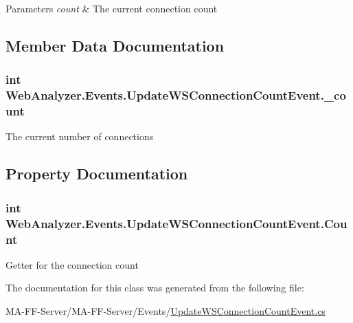 \begin{DoxyParams}{Parameters}
{\em count} & The current connection count\\
\hline
\end{DoxyParams}


\subsection{Member Data Documentation}
\hypertarget{class_web_analyzer_1_1_events_1_1_update_w_s_connection_count_event_a8a23f51bfc9370c1d7b56b4fbe2fedb1}{}
\subsubsection[{\+\_\+count}]{\setlength{\rightskip}{0pt plus 5cm}int Web\+Analyzer.\+Events.\+Update\+W\+S\+Connection\+Count\+Event.\+\_\+count\hspace{0.3cm}{\ttfamily [private]}}\label{class_web_analyzer_1_1_events_1_1_update_w_s_connection_count_event_a8a23f51bfc9370c1d7b56b4fbe2fedb1}


The current number of connections 



\subsection{Property Documentation}
\hypertarget{class_web_analyzer_1_1_events_1_1_update_w_s_connection_count_event_acb56db24868f14519a9bb0781413a337}{}
\subsubsection[{Count}]{\setlength{\rightskip}{0pt plus 5cm}int Web\+Analyzer.\+Events.\+Update\+W\+S\+Connection\+Count\+Event.\+Count\hspace{0.3cm}{\ttfamily [get]}}\label{class_web_analyzer_1_1_events_1_1_update_w_s_connection_count_event_acb56db24868f14519a9bb0781413a337}


Getter for the connection count 



The documentation for this class was generated from the following file\+:\begin{DoxyCompactItemize}
\item 
M\+A-\/\+F\+F-\/\+Server/\+M\+A-\/\+F\+F-\/\+Server/\+Events/\hyperlink{_update_w_s_connection_count_event_8cs}{Update\+W\+S\+Connection\+Count\+Event.\+cs}\end{DoxyCompactItemize}
